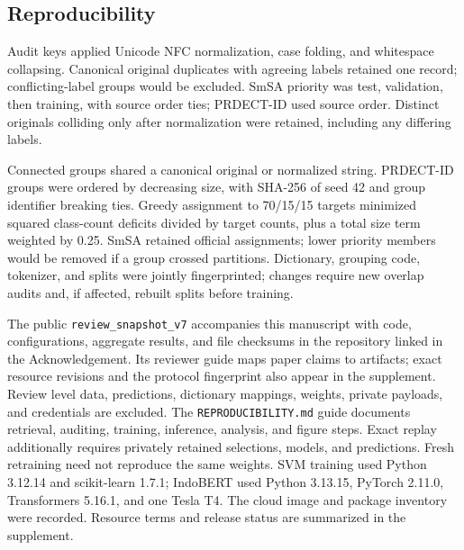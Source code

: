\subsection{Reproducibility}
Audit keys applied Unicode NFC normalization, case folding, and whitespace collapsing. Canonical original duplicates with agreeing labels retained one record; conflicting-label groups would be excluded. SmSA priority was test, validation, then training, with source order ties; PRDECT-ID used source order. Distinct originals colliding only after normalization were retained, including any differing labels.

Connected groups shared a canonical original or normalized string. PRDECT-ID groups were ordered by decreasing size, with SHA-256 of seed 42 and group identifier breaking ties. Greedy assignment to 70/15/15 targets minimized squared class-count deficits divided by target counts, plus a total size term weighted by 0.25. SmSA retained official assignments; lower priority members would be removed if a group crossed partitions. Dictionary, grouping code, tokenizer, and splits were jointly fingerprinted; changes require new overlap audits and, if affected, rebuilt splits before training.

The public \texttt{review\_snapshot\_v7} accompanies this manuscript with code, configurations, aggregate results, and file checksums in the repository linked in the Acknowledgement. Its reviewer guide maps paper claims to artifacts; exact resource revisions and the protocol fingerprint also appear in the supplement. Review level data, predictions, dictionary mappings, weights, private payloads, and credentials are excluded. The \texttt{REPRODUCIBILITY.md} guide documents retrieval, auditing, training, inference, analysis, and figure steps. Exact replay additionally requires privately retained selections, models, and predictions. Fresh retraining need not reproduce the same weights. SVM training used Python 3.12.14 and scikit-learn 1.7.1; IndoBERT used Python 3.13.15, PyTorch 2.11.0, Transformers 5.16.1, and one Tesla T4. The cloud image and package inventory were recorded. Resource terms and release status are summarized in the supplement.
